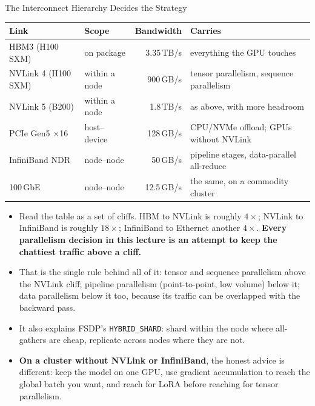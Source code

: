 \begin{frame}{The Interconnect Hierarchy Decides the Strategy}
  \centering
  \scriptsize
  \begin{tabular}{@{}llrp{4.6cm}@{}}
    \toprule
    \textbf{Link} & \textbf{Scope} & \textbf{Bandwidth} & \textbf{Carries} \\
    \midrule
    HBM3 (H100 SXM)          & on package    & 3.35\,TB/s & everything the GPU touches \\
    NVLink 4 (H100 SXM)      & within a node & 900\,GB/s  & tensor parallelism, sequence parallelism \\
    NVLink 5 (B200)          & within a node & 1.8\,TB/s  & as above, with more headroom \\
    PCIe Gen5 $\times$16     & host--device  & 128\,GB/s  & CPU/NVMe offload; GPUs without NVLink \\
    InfiniBand NDR           & node--node    & 50\,GB/s   & pipeline stages, data-parallel all-reduce \\
    100\,GbE                 & node--node    & 12.5\,GB/s & the same, on a commodity cluster \\
    \bottomrule
  \end{tabular}
  \vspace{0.21em}
  \begin{itemize}\scriptsize\itemsep0.05em
    \item[\textcolor{red}{$\blacktriangleright$}] Read the table as a set of cliffs. HBM to NVLink is roughly $4\times$; NVLink to InfiniBand is roughly $18\times$; InfiniBand to Ethernet another $4\times$. \textbf{Every parallelism decision in this lecture is an attempt to keep the chattiest traffic above a cliff.}
    \item[\textcolor{red}{$\blacktriangleright$}] That is the single rule behind all of it: tensor and sequence parallelism above the NVLink cliff; pipeline parallelism (point-to-point, low volume) below it; data parallelism below it too, because its traffic can be overlapped with the backward pass.
    \item[\textcolor{red}{$\blacktriangleright$}] It also explains FSDP's \texttt{HYBRID\_SHARD}: shard within the node where all-gathers are cheap, replicate across nodes where they are not.
    \item[\textcolor{red}{$\blacktriangleright$}] \textbf{On a cluster without NVLink or InfiniBand}, the honest advice is different: keep the model on one GPU, use gradient accumulation to reach the global batch you want, and reach for LoRA before reaching for tensor parallelism.
  \end{itemize}
\end{frame}

